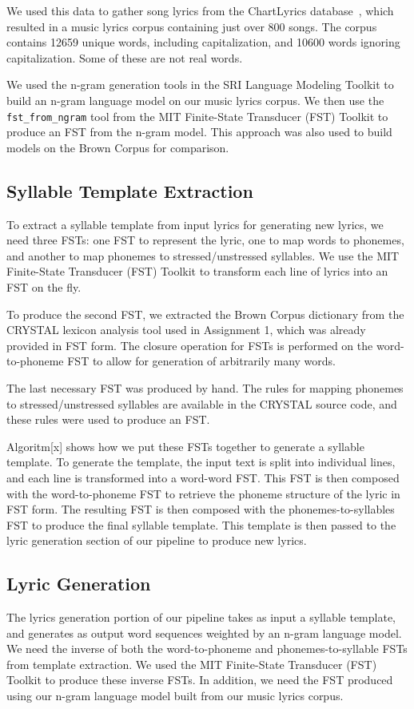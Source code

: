 \documentclass{vgtc}                          %
\begin{document}
We used this data to gather song lyrics from the ChartLyrics database~\cite{chartlyrics},
which resulted in a music lyrics corpus containing just over 800 songs. The corpus
contains 12659 unique words, including capitalization, and 10600 words
ignoring capitalization. Some of these are not real words.

We used the n-gram generation tools in the SRI Language Modeling Toolkit to build
an n-gram language model on our music lyrics corpus. We then use the
\texttt{fst\_from\_ngram} tool from
the MIT Finite-State Transducer (FST) Toolkit to produce
an FST from the n-gram model. This approach was also used to build
models on the Brown Corpus for comparison.

\subsection{Syllable Template Extraction}
To extract a syllable template from input lyrics for generating
new lyrics, we need three FSTs: one FST to represent the lyric,
one to map words to phonemes, and
another to map phonemes to stressed/unstressed syllables.
We use the MIT Finite-State Transducer (FST) Toolkit
to transform each line of lyrics into an FST on the fly.

To produce the second FST, we extracted
the Brown Corpus dictionary from the CRYSTAL lexicon
analysis tool used in Assignment 1, which was already
provided in FST form. The closure operation for FSTs
is performed on the word-to-phoneme FST to allow for
generation of arbitrarily many words.

The last necessary FST was produced by hand. The rules for mapping
phonemes to stressed/unstressed syllables
are available in the CRYSTAL source code, and these
rules were used to produce an FST.

Algoritm[x] shows how we put these FSTs together to generate a syllable template.
To generate the template, the input text is split into individual lines, and
each line is transformed into a word-word FST.
This FST is then composed with the word-to-phoneme FST
to retrieve the phoneme structure of the lyric in FST
form. The resulting FST is then composed with the phonemes-to-syllables
FST to produce the final syllable template. This template is then
passed to the lyric generation section of our pipeline to produce
new lyrics.

\subsection{Lyric Generation}
The lyrics generation portion of our pipeline takes as input
a syllable template, and generates as output word sequences
weighted by an n-gram language model. We need the inverse
of both the word-to-phoneme and phonemes-to-syllable
FSTs from template extraction. We used the MIT Finite-State
Transducer (FST) Toolkit to produce these inverse FSTs.
In addition, we need the FST produced using our n-gram language
model built from our music lyrics corpus.
\end{document}
